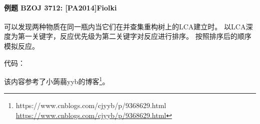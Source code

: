 \paragraph{例题 BZOJ 3712: [PA2014]Fiolki}

可以发现两种物质在同一瓶内当它们在并查集重构树上的LCA建立时。
以LCA深度为第一关键字，反应优先级为第二关键字对反应进行排序。
按照排序后的顺序模拟反应。

代码：


该内容参考了小蒟蒻yyb的博客\footnote{
    https://www.cnblogs.com/cjyyb/p/9368629.html
    \url{https://www.cnblogs.com/cjyyb/p/9368629.html}
}。
